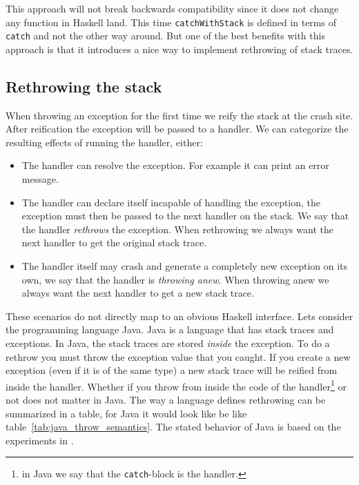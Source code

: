 This approach will not break backwards compatibility since it does not
change any function in Haskell land. This time \texttt{catchWithStack}
is defined in terms of \texttt{catch} and not the other way around.
But one of the best benefits with this approach is that it introduces a
nice way to implement rethrowing of stack traces.



\subsection{Rethrowing the stack} \label{sec:rethrowing_the_stack}

When throwing an exception for the first time we reify the stack
at the crash site. After reification the exception will be passed to a handler.
We can categorize the resulting effects of running the handler, either:

\begin{itemize}
  \item
    The handler can resolve the exception. For example it can print an
    error message.

  \item
    The handler can declare itself incapable of handling the exception,
    the exception must then be passed to the next handler on the stack.
    We say that the handler \emph{rethrows} the exception. When
    rethrowing we always want the next handler to get the original stack
    trace.

  \item
    The handler itself may crash and generate a completely new exception
    on its own, we say that the handler is \emph{throwing anew}. When
    throwing anew we always want the next handler to get a new stack
    trace.

\end{itemize}

These scenarios do not directly map to an obvious Haskell
interface. Lets consider the programming language Java. Java is a
language that has stack traces and exceptions. In Java, the stack traces
are stored \emph{inside} the exception. To do a rethrow you must throw
the exception value that you caught. If you create a new exception (even
if it is of the same type) a new stack trace will be reified from inside
the handler. Whether if you throw from inside the code of the
handler\footnote{in Java we say that the \texttt{catch}-block is the handler.}
or not does not matter in Java. The way a language defines rethrowing can be summarized
in a table, for Java it would look like be like table~\ref{tab:java_throw_semantics}. The
stated behavior of Java is based on the experiments in \cite{github_gist_in_out_java}.

